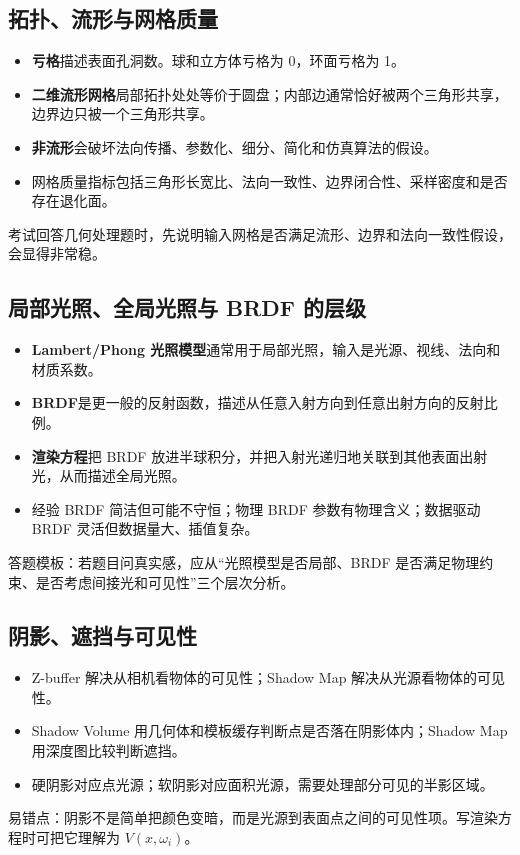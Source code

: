 \documentclass[UTF8,fontset=fandol,11pt]{ctexart}
\newcommand{\key}[1]{\textbf{#1}}
\begin{document}
\subsection{拓扑、流形与网格质量}
\begin{itemize}
  \item \key{亏格}描述表面孔洞数。球和立方体亏格为 0，环面亏格为 1。
  \item \key{二维流形网格}局部拓扑处处等价于圆盘；内部边通常恰好被两个三角形共享，边界边只被一个三角形共享。
  \item \key{非流形}会破坏法向传播、参数化、细分、简化和仿真算法的假设。
  \item 网格质量指标包括三角形长宽比、法向一致性、边界闭合性、采样密度和是否存在退化面。
\end{itemize}
考试回答几何处理题时，先说明输入网格是否满足流形、边界和法向一致性假设，会显得非常稳。

\subsection{局部光照、全局光照与 BRDF 的层级}
\begin{itemize}
  \item \key{Lambert/Phong 光照模型}通常用于局部光照，输入是光源、视线、法向和材质系数。
  \item \key{BRDF}是更一般的反射函数，描述从任意入射方向到任意出射方向的反射比例。
  \item \key{渲染方程}把 BRDF 放进半球积分，并把入射光递归地关联到其他表面出射光，从而描述全局光照。
  \item 经验 BRDF 简洁但可能不守恒；物理 BRDF 参数有物理含义；数据驱动 BRDF 灵活但数据量大、插值复杂。
\end{itemize}
答题模板：若题目问真实感，应从“光照模型是否局部、BRDF 是否满足物理约束、是否考虑间接光和可见性”三个层次分析。

\subsection{阴影、遮挡与可见性}
\begin{itemize}
  \item Z-buffer 解决从相机看物体的可见性；Shadow Map 解决从光源看物体的可见性。
  \item Shadow Volume 用几何体和模板缓存判断点是否落在阴影体内；Shadow Map 用深度图比较判断遮挡。
  \item 硬阴影对应点光源；软阴影对应面积光源，需要处理部分可见的半影区域。
\end{itemize}
易错点：阴影不是简单把颜色变暗，而是光源到表面点之间的可见性项。写渲染方程时可把它理解为 $V(x,\omega_i)$。
\end{document}
